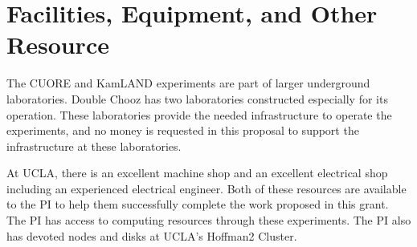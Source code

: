 \section{Facilities, Equipment, and Other Resource}
The CUORE and KamLAND experiments are part of larger underground laboratories. Double Chooz has two laboratories constructed especially for its operation. These laboratories provide the needed infrastructure to operate the experiments, and no money is requested in this proposal to support the infrastructure at these laboratories. 

At UCLA, there is an excellent machine shop and an excellent electrical shop including an experienced electrical engineer. Both of these resources are available to the PI to help them successfully complete the work proposed in this grant. The PI has access to computing resources through these experiments. The PI also has devoted nodes and disks at UCLA's Hoffman2 Cluster.